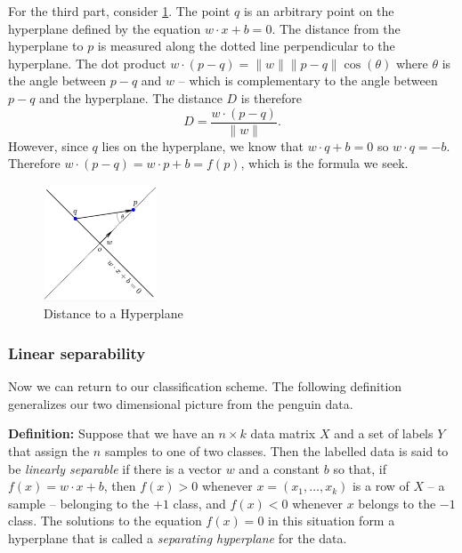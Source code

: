 \documentclass[
]{article}
\begin{document}
For the third part, consider \cref{fig:triangle}. The point \(q\) is an
arbitrary point on the hyperplane defined by the equation
\(w\cdot x+b=0\). The distance from the hyperplane to \(p\) is measured
along the dotted line perpendicular to the hyperplane. The dot product
\(w\cdot (p-q) = \|w\|\|p-q\|\cos(\theta)\) where \(\theta\) is the
angle between \(p-q\) and \(w\) -- which is complementary to the angle
between \(p-q\) and the hyperplane. The distance \(D\) is therefore \[
D=\frac{w\cdot(p-q)}{\|w\|}.
\] However, since \(q\) lies on the hyperplane, we know that
\(w\cdot q+b=0\) so \(w\cdot q = -b\). Therefore
\(w\cdot(p-q)=w\cdot p+b=f(p)\), which is the formula we seek.

\begin{figure}
\hypertarget{fig:triangle}{%
\centering
\includegraphics[width=0.3\textwidth,height=\textheight]{../img/triangle.png}
\caption{Distance to a Hyperplane}\label{fig:triangle}
}
\end{figure}

\hypertarget{sec:linearseparable}{%
\subsubsection{Linear separability}\label{sec:linearseparable}}

Now we can return to our classification scheme. The following definition
generalizes our two dimensional picture from the penguin data.

\textbf{Definition:} Suppose that we have an \(n\times k\) data matrix
\(X\) and a set of labels \(Y\) that assign the \(n\) samples to one of
two classes. Then the labelled data is said to be \emph{linearly
separable} if there is a vector \(w\) and a constant \(b\) so that, if
\(f(x)=w\cdot x+b\), then \(f(x)>0\) whenever \(x=(x_1,\ldots, x_k)\) is
a row of \(X\) -- a sample -- belonging to the \(+1\) class, and
\(f(x)<0\) whenever \(x\) belongs to the \(-1\) class. The solutions to
the equation \(f(x)=0\) in this situation form a hyperplane that is
called a \emph{separating hyperplane} for the data.
\end{document}
